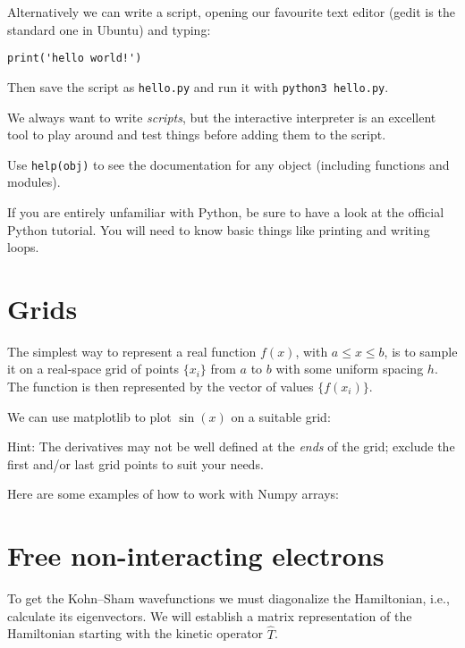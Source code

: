 \documentclass{article}
\begin{document}
Alternatively we can write a script, opening our favourite text editor (gedit is the standard one in Ubuntu) and typing:
\begin{lstlisting}
print('hello world!')
\end{lstlisting}
Then save the script as \texttt{hello.py} and run it with
\texttt{python3 hello.py}.

We always want to write \emph{scripts},
but the interactive interpreter is an excellent tool to play around and test
things before adding them to the script.

Use \lstinline{help(obj)} to see the documentation for any object
(including functions and modules).

If you are entirely unfamiliar with Python, be sure to have a look at
the official Python tutorial.  You will need to know basic things like
printing and writing loops.

\section*{Grids}
The simplest way to represent a real function $f(x)$,
with $a \le x \le b$, is to
sample it on a real-space grid of points $\{x_i\}$ from $a$ to $b$ with some
uniform spacing $h$.
The function is then represented by the vector of values $\{f(x_i)\}$.

\noindent We can use matplotlib to plot $\sin(x)$ on a suitable grid:




\noindent Hint: The derivatives may not be well defined at the
\emph{ends} of the grid; exclude the first and/or last grid points to
suit your needs.

\noindent Here are some examples of how to work with Numpy arrays:


\section*{Free non-interacting electrons}

To get the Kohn--Sham wavefunctions we must diagonalize the
Hamiltonian, i.e., calculate its eigenvectors.  We will establish a matrix
representation of the Hamiltonian starting with the kinetic operator
$\hat T$.
\end{document}
